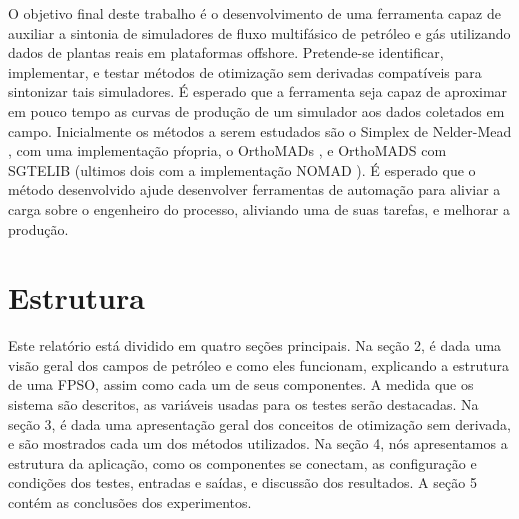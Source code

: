 O objetivo final deste trabalho é o desenvolvimento de uma ferramenta capaz de auxiliar a sintonia de simuladores de fluxo multifásico de petróleo e gás utilizando dados de plantas reais em plataformas offshore. 
%
Pretende-se identificar, implementar, e testar métodos de otimização sem derivadas compatíveis para sintonizar tais simuladores.
%
É esperado que a ferramenta seja capaz de aproximar em pouco tempo as curvas de produção de um simulador aos dados coletados em campo.
%
Inicialmente os métodos a serem estudados são o Simplex de Nelder-Mead \cite{Singer:2009}, com uma implementação pŕopria, o OrthoMADs \cite{DBLP:journals/siamjo/AbramsonADD09}, e OrthoMADS com SGTELIB (ultimos dois com a implementação NOMAD \cite{Nomad}).
%
É esperado que o método desenvolvido ajude desenvolver ferramentas de automação para aliviar a carga sobre o engenheiro do processo, aliviando uma de suas tarefas, e melhorar a produção.
%

%
\section{Estrutura}

Este relatório está dividido em quatro seções principais.
%
Na seção 2, é dada uma visão geral dos campos de petróleo e como eles funcionam, explicando a estrutura de uma FPSO, assim como cada um de seus componentes. 
%
A medida que os sistema são descritos, as variáveis usadas para os testes serão destacadas.
%
Na seção 3, é dada uma apresentação geral dos conceitos de otimização sem derivada, e são mostrados cada um dos métodos utilizados.
%
Na seção 4, nós apresentamos a estrutura da aplicação, como os componentes se conectam, as configuração e condições dos testes, entradas e saídas, e discussão dos resultados.
%
A seção 5 contém as conclusões dos experimentos.

 

